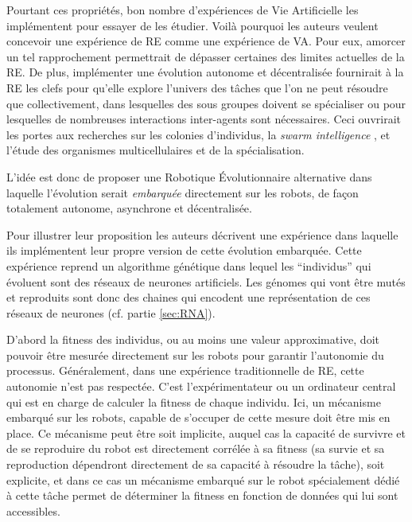 Pourtant ces propriétés, bon nombre d'expériences de Vie Artificielle les implémentent pour essayer de les étudier. Voilà pourquoi les auteurs veulent concevoir une expérience de RE comme une expérience de VA. Pour eux, amorcer un tel rapprochement permettrait de dépasser certaines des limites actuelles de la RE. De plus, implémenter une évolution autonome et décentralisée fournirait à la RE les clefs pour qu'elle explore l'univers des tâches que l'on ne peut résoudre que collectivement, dans lesquelles des sous groupes doivent se spécialiser ou pour lesquelles de nombreuses interactions inter-agents sont nécessaires. Ceci ouvrirait les portes aux recherches sur les colonies d'individus, la \emph{swarm intelligence} \citep{garnier2007biologicalprincipeswarmintelligence}, et l'étude des organismes multicellulaires et de la spécialisation.

L'idée est donc de proposer une Robotique \'Evolutionnaire alternative dans laquelle l'évolution serait \emph{embarquée} directement sur les robots, de façon totalement autonome, asynchrone et décentralisée.

Pour illustrer leur proposition les auteurs décrivent une expérience dans laquelle ils implémentent leur propre version de cette évolution embarquée. Cette expérience reprend un algorithme génétique dans lequel les ``individus'' qui évoluent sont des réseaux de neurones artificiels. Les génomes qui vont être mutés et reproduits sont donc des chaines qui encodent une représentation de ces réseaux de neurones (cf. partie \ref{sec:RNA}).

D'abord la fitness des individus, ou au moins une valeur approximative, doit pouvoir être mesurée directement sur les robots pour garantir l'autonomie du processus. Généralement, dans une expérience traditionnelle de RE, cette autonomie n'est pas respectée. C'est l'expérimentateur ou un ordinateur central qui est en charge de calculer la fitness de chaque individu. Ici, un mécanisme embarqué sur les robots, capable de s'occuper de cette mesure doit être mis en place. Ce mécanisme peut être soit implicite, auquel cas la capacité de survivre et de se reproduire du robot est directement corrélée à sa fitness (sa survie et sa reproduction dépendront directement de sa capacité à résoudre la tâche), soit explicite, et dans ce cas un mécanisme embarqué sur le robot spécialement dédié à cette tâche permet de déterminer la fitness en fonction de données qui lui sont accessibles.

